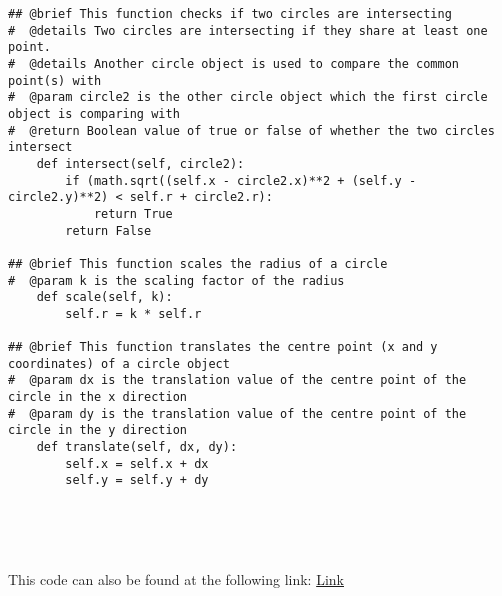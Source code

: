 \documentclass[12pt]{article}
\begin{document}
\begin{lstlisting}
## @brief This function checks if two circles are intersecting
#  @details Two circles are intersecting if they share at least one point.
#  @details Another circle object is used to compare the common point(s) with
#  @param circle2 is the other circle object which the first circle object is comparing with
#  @return Boolean value of true or false of whether the two circles intersect
    def intersect(self, circle2):
        if (math.sqrt((self.x - circle2.x)**2 + (self.y - circle2.y)**2) < self.r + circle2.r):
            return True
        return False

## @brief This function scales the radius of a circle
#  @param k is the scaling factor of the radius
    def scale(self, k):
        self.r = k * self.r

## @brief This function translates the centre point (x and y coordinates) of a circle object
#  @param dx is the translation value of the centre point of the circle in the x direction
#  @param dy is the translation value of the centre point of the circle in the y direction
    def translate(self, dx, dy):
        self.x = self.x + dx
        self.y = self.y + dy

    
\end{lstlisting}

~\newline

\noindent This code can also be found at the following link:
\href{https://gitlab.cas.mcmaster.ca/se2aa4_cs2me3_assignments/patelm16/blob/master/A1/src/CircleADT.py}{Link}

\newpage
\end{document}
